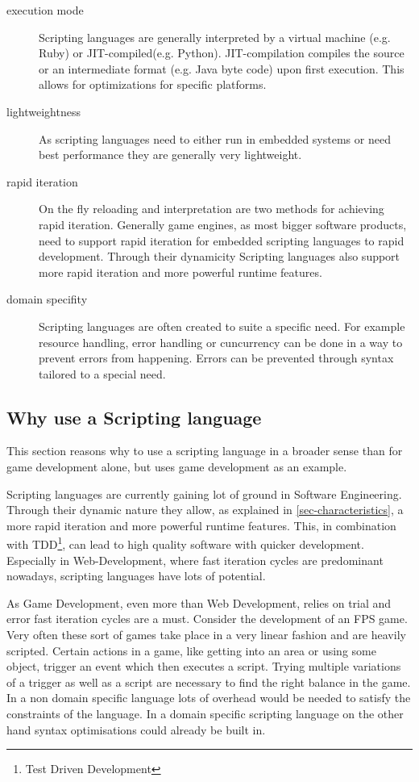 \documentclass{article}
\begin{document}
\begin{description}
\item[execution mode] Scripting languages are generally interpreted by a
virtual machine (e.g. Ruby) or JIT-compiled(e.g. Python). JIT-compilation
compiles the source or an intermediate format (e.g. Java byte code) upon first
execution. This allows for optimizations for specific platforms.
\item[lightweightness] As scripting languages need to either run in embedded
systems or need best performance they are generally very lightweight.
\item[rapid iteration] On the fly reloading and interpretation are two methods
for achieving rapid iteration. Generally game engines, as most bigger software
products, need to support rapid iteration for embedded scripting languages to
rapid development. Through their dynamicity Scripting languages also support
more rapid iteration and more powerful runtime features.
\item[domain specifity] Scripting languages are often created to suite a
specific need. For example resource handling, error handling or cuncurrency can
be done in a way to prevent errors from happening. Errors can be prevented
through syntax tailored to a special need.
\end{description}

\subsection{Why use a Scripting language}
This section reasons why to use a scripting language in a broader sense than
for game development alone, but uses game development as an example.

Scripting languages are currently gaining lot of ground in Software Engineering.
Through their dynamic nature they allow, as explained in
\ref{sec-characteristics}, a more rapid iteration and more powerful runtime
features. This, in combination with TDD\footnote{Test Driven Development}, can
lead to high quality software with quicker development. Especially in
Web-Development, where fast iteration cycles are predominant nowadays,
scripting languages have lots of potential.

As Game Development, even more than Web Development, relies on trial and error
fast iteration cycles are a must. Consider the development of an FPS game. Very
often these sort of games take place in a very linear fashion and are heavily
scripted. Certain actions in a game, like getting into an area or using some
object, trigger an event which then executes a script. Trying multiple
variations of a trigger as well as a script are necessary to find the right
balance in the game. In a non domain specific language lots of overhead would
be needed to satisfy the constraints of the language. In a domain specific
scripting language on the other hand syntax optimisations could already be
built in.
\end{document}
